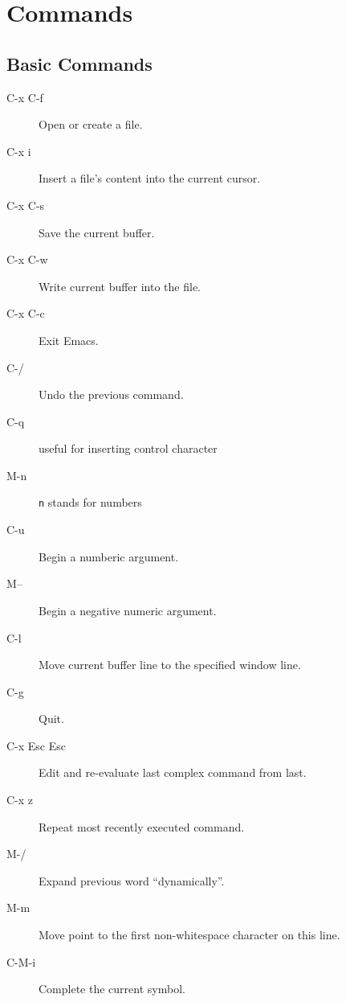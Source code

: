 \chapter{Commands}

\section{Basic Commands}
\begin{description}
\item[C-x C-f] Open or create a file.
\item[C-x i] Insert a file's content into the current cursor.
\item[C-x C-s] Save the current buffer.
\item[C-x C-w] Write current buffer into the file.
\item[C-x C-c] Exit Emacs. 
\item[C-/] Undo the previous command.
\item[C-q] useful for inserting control character 
\item[M-n] \verb|n| stands for numbers 
\item[C-u] Begin a numberic argument. 
\item[M--] Begin a negative numeric argument. 
\item[C-l] Move current buffer line to the specified window line.
\item[C-g] Quit.
\item[C-x Esc Esc] Edit and re-evaluate last complex command from last.
\item[C-x z] Repeat most recently executed command.
\item[M-/] Expand previous word ``dynamically''.
\item[M-m] Move point to the first non-whitespace character on this line.
\item[C-M-i] Complete the current symbol.
\end{description}





